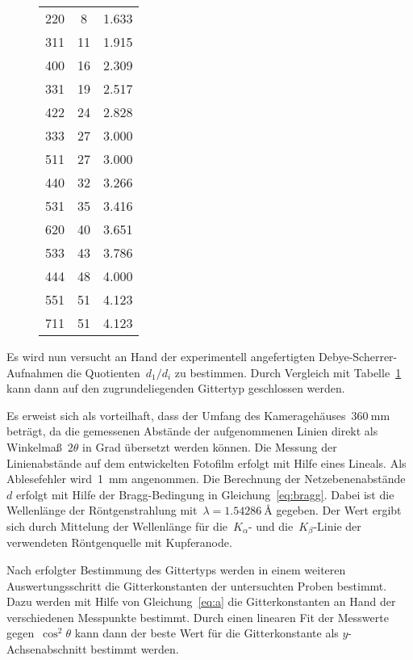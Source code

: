 \begin{figure}[h]
\begin{subtable}{0.45\textwidth}
\begin{tabular}{S[table-format=3]
                    S[table-format=2]
                    S[table-format=1.3]}
      220 &  8 & 1.633 \\
      311 & 11 & 1.915 \\
      400 & 16 & 2.309 \\
      331 & 19 & 2.517 \\
      422 & 24 & 2.828 \\
      333 & 27 & 3.000 \\
      511 & 27 & 3.000 \\
      440 & 32 & 3.266 \\
      531 & 35 & 3.416 \\
      620 & 40 & 3.651 \\
      533 & 43 & 3.786 \\
      444 & 48 & 4.000 \\
      551 & 51 & 4.123 \\
      711 & 51 & 4.123 \\
      \bottomrule
    \end{tabular}
  \end{subtable}
  \label{tab:theorie}
\end{figure}

Es wird nun versucht an Hand der experimentell angefertigten
Debye-Scherrer-Aufnahmen die Quotienten~$d_1/d_i$ zu bestimmen. Durch Vergleich
mit Tabelle~\ref{tab:theorie} kann dann auf den zugrundeliegenden Gittertyp
geschlossen werden.

Es erweist sich als vorteilhaft, dass der Umfang des
Kameragehäuses~$\SI{360}{\milli\metre}$ beträgt, da die gemessenen Abstände der
aufgenommenen Linien direkt als Winkelmaß~$2\theta$ in Grad übersetzt werden
können. Die Messung der Linienabstände auf dem entwickelten Fotofilm erfolgt mit
Hilfe eines Lineals. Als Ablesefehler wird~\SI{1}{\milli\metre} angenommen. Die
Berechnung der Netzebenenabstände~$d$ erfolgt mit Hilfe der Bragg-Bedingung in
Gleichung~\eqref{eq:bragg}. Dabei ist die Wellenlänge der Röntgenstrahlung
mit~$\lambda=\SI{1.54286}{\angstrom}$ gegeben. Der Wert ergibt sich durch
Mittelung der Wellenlänge für die~$K_{\alpha}$- und die~$K_{\beta}$-Linie der
verwendeten Röntgenquelle mit Kupferanode.

Nach erfolgter Bestimmung des Gittertyps werden in einem weiteren
Auswertungsschritt die Gitterkonstanten der untersuchten Proben bestimmt. Dazu
werden mit Hilfe von Gleichung~\eqref{eq:a} die Gitterkonstanten an Hand der
verschiedenen Messpunkte bestimmt. Durch einen linearen Fit der Messwerte
gegen~$\cos^2{\theta}$ kann dann der beste Wert für die Gitterkonstante als
$y$-Achsenabschnitt bestimmt werden.

